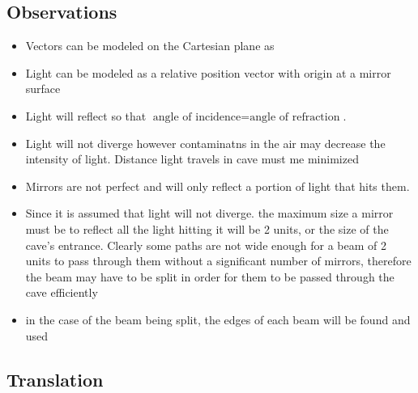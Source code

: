 \documentclass[11pt, letterpaper]{article}
\begin{document}
\subsection{Observations}
\par
\begin{itemize}
\item Vectors can be modeled on the Cartesian plane as 

\item Light can be modeled as a relative position vector with origin at a mirror surface

\item Light will reflect so that $\textrm{angle  of incidence} = \textrm{angle of refraction}$.

\item Light will not diverge however contaminatns in the air may decrease the intensity of light. Distance light travels in cave must me minimized

\item Mirrors are not perfect and will only reflect a portion of light that hits them. 

\item  Since it is assumed that light will not diverge. the maximum size a mirror must be to reflect all the light hitting it will be 2 units, or the size of the cave's entrance. Clearly some paths are not wide enough for a beam of 2 units to pass through them without a significant number of mirrors, therefore the beam may have to be split in order for them to be passed through the cave efficiently 

\item in the case of the beam being split, the edges of each beam will be found and used 

\end{itemize}





\subsection{Translation}
\par 
\end{document}
